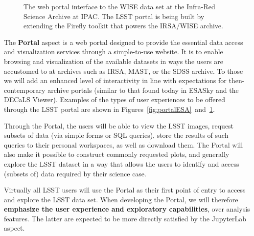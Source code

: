 \documentclass[DM,lsstdraft,toc]{lsstdoc}
\begin{document}
\begin{figure}
	\centering
	\caption{The web portal interface to the WISE data set at the Infra-Red Science Archive at IPAC. The LSST portal is being built by extending the Firefly toolkit that powers the IRSA/WISE archive.
		\label{fig:portalIRSA}}
\end{figure}

The {\bf Portal} aspect is a web portal designed to provide the essential data
access and visualization services through a simple-to-use website.  It is to
enable browsing and visualization of the available datasets in ways the
users are accustomed to at archives such as IRSA, MAST, or the SDSS archive.
To those we will add an enhanced level of interactivity in line with expectations for
then-contemporary archive portals (similar to that found today in ESASky and 
the DECaLS Viewer). Examples of the types of user experiences to be offered
through the LSST portal are shown in Figures~\ref{fig:portalESA}~and~\ref{fig:portalIRSA}.

Through the Portal, the users will be
able to view the LSST images, request subsets of data (via simple forms or
SQL queries), store the results of such queries to their personal
workspaces, as well as download them. The Portal will also make it possible to
construct commonly requested plots, and generally explore the
LSST dataset in a way that allows the users to identify and access (subsets of)
data required by their science case.

Virtually all LSST users will use the Portal as their first point of entry to
access and explore the LSST data set. When developing the Portal,
we will therefore {\bf emphasize the user experience and exploratory
capabilities}, over analysis features. The latter are expected to be more
directly satisfied by the JupyterLab aspect.
\end{document}
